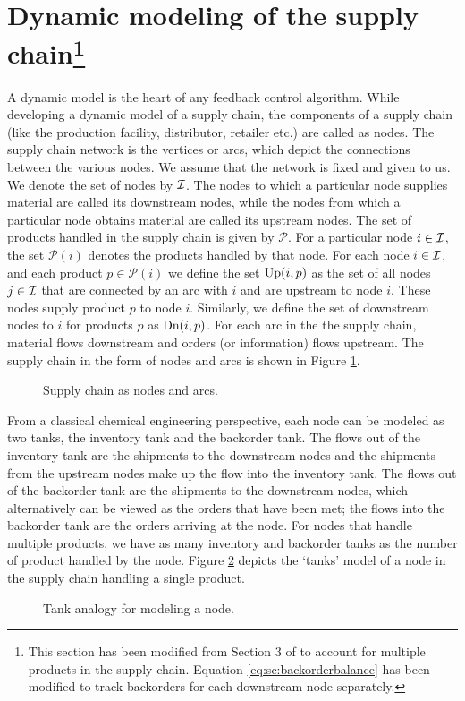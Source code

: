 \section{Dynamic modeling of the supply chain\footnote{ This section has been modified from Section 3 of
\citet{subramanian:rawlings:maravelias:2012} to account for multiple
products in the supply chain. Equation \eqref{eq:sc:backorderbalance} has
been modified to track backorders for each downstream node separately.}}
\label{sec:sc:modeling}
A dynamic model is the heart of any feedback control algorithm. While
developing a dynamic model of a supply chain, the components of a
supply chain (like the production facility, distributor, retailer
etc.) are called as nodes. The supply chain network is the vertices or
arcs, which depict the connections between the various nodes. We
assume that the network is fixed and given to us. 
We denote the set of nodes by $\mathcal{I}$. The nodes to which a particular
node supplies material are called its 
downstream nodes, while the nodes from which a particular node obtains
material are called its upstream nodes.  The set of products handled
in the supply chain is given by 
$\mathcal{P}$. For a particular node $i \in \mathcal{I}$, the set
$\mathcal{P}(i)$ denotes the products handled by that node.
For each node $i \in
\mathcal{I}$, and each product $p \in \mathcal{P}(i)$ we define the set $\textrm{Up}(i,p)$ as the set of all nodes $j \in
\mathcal{I}$ that are connected by an arc with $i$ and  are
upstream to node $i$. These nodes supply product $p$ to node $i$.
Similarly, we define the set of downstream nodes 
to $i$ for products $p$ as $\textrm{Dn}(i,p)$. For each arc in the the supply
chain, material flows downstream and orders (or information) flows
upstream.
The supply chain in the form of nodes and arcs is shown in
Figure \ref{fig:sc:Nodes_and_Arcs}.
\begin{figure}[h]
 \centering
 {\resizebox{0.75\textwidth}{!}{}}
\caption{Supply chain as nodes and arcs.}
 \label{fig:sc:Nodes_and_Arcs}
\end{figure}

From a classical chemical engineering perspective, each node can be
modeled as two tanks, the inventory tank and the backorder tank. 
 The flows out of the inventory tank are the shipments
to the downstream nodes and the shipments from the upstream nodes make
up the flow into the inventory tank. The flows out of the backorder
tank are the shipments to the downstream nodes, which 
alternatively can be viewed as the orders that have been met; the
flows into the backorder tank are the orders arriving at the
node. For nodes that handle multiple products, we have as many
inventory and backorder tanks as the number of product handled by
the node.  Figure
\ref{fig:sc:nodemodel} depicts the `tanks' model of a node in the supply
chain handling a single product.
 \begin{figure}[h]
\centering
{\resizebox{0.75\textwidth}{!}{}}
\caption{Tank analogy for modeling a node.}
\label{fig:sc:nodemodel}
\end{figure}

